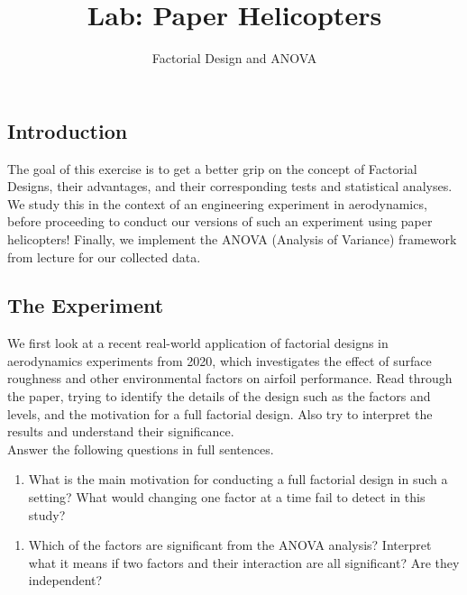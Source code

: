 \documentclass[
  letterpaper,
  DIV=11,
  numbers=noendperiod]{scrartcl}
\title{Lab: Paper Helicopters}
\subtitle{Factorial Design and ANOVA}
\author{}
\date{}
\providecommand{\tightlist}{%
  \setlength{\itemsep}{0pt}\setlength{\parskip}{0pt}}
\begin{document}
\maketitle


\subsection{Introduction}\label{introduction}

The goal of this exercise is to get a better grip on the concept of
Factorial Designs, their advantages, and their corresponding tests and
statistical analyses. We study this in the context of an engineering
experiment in aerodynamics, before proceeding to conduct our versions of
such an experiment using paper helicopters! Finally, we implement the
ANOVA (Analysis of Variance) framework from lecture for our collected
data.\\

\subsection{The Experiment}\label{the-experiment}

We first look at a recent real-world application of factorial designs in
aerodynamics experiments from 2020, which investigates the effect of
surface roughness and other environmental factors on airfoil
performance. Read through the paper, trying to identify the details of
the design such as the factors and levels, and the motivation for a full
factorial design. Also try to interpret the results and understand their
significance.\\

Answer the following questions in full sentences.

\begin{enumerate}
\def\labelenumi{\arabic{enumi}.}
\tightlist
\item
  What is the main motivation for conducting a full factorial design in
  such a setting? What would changing one factor at a time fail to
  detect in this study?
\end{enumerate}

\hfill\break
\hfill\break
\hfill\break
\hfill\break
\hfill\break
\hfill\break
\hfill\break
\hfill\break

\begin{enumerate}
\def\labelenumi{\arabic{enumi}.}
\setcounter{enumi}{1}
\tightlist
\item
  Which of the factors are significant from the ANOVA analysis?
  Interpret what it means if two factors and their interaction are all
  significant? Are they independent?
\end{enumerate}
\end{document}
